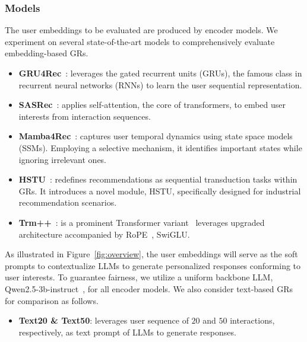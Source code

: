 \subsubsection{\textbf{Models}}
The user embeddings to be evaluated are produced by encoder models. 
We experiment on several state-of-the-art models to comprehensively evaluate embedding-based GRs. 
\begin{itemize}[leftmargin=*]
\item \textbf{GRU4Rec}~\cite{hidasi2015session}: leverages the gated recurrent units (GRUs), the famous class in recurrent neural networks (RNNs) to learn the user sequential representation.
\item \textbf{SASRec}~\cite{kang2018self}: applies self-attention, the core of transformers, to embed user interests from interaction sequences.
\item \textbf{Mamba4Rec}~\cite{liu2024mamba4rec}: captures user temporal dynamics using state space models (SSMs). Employing a selective mechanism, it identifies important states while ignoring irrelevant ones. 
\item \textbf{HSTU}~\cite{zhai2024actions}: redefines recommendations as sequential transduction tasks within GRs. It introduces a novel module, HSTU, specifically designed for industrial recommendation scenarios.
\item \textbf{Trm++}~\cite{zhai2024actions}: is a prominent Transformer variant~\cite{touvron2023llama} leverages upgraded architecture accompanied by RoPE~\cite{su2024roformer}, SwiGLU.
\end{itemize}
As illustrated in Figure~\ref{fig:overview}, the user embeddings will serve as the soft prompts to contextualize LLMs to generate personalized responses conforming to user interests. To guarantee fairness, we utilize a uniform backbone LLM, Qwen2.5-3b-instruct~\cite{yang2024qwen2}, for all encoder models. We also consider text-based GRs for comparison as follows.
\begin{itemize}[leftmargin=*]
\item \textbf{Text20 \& Text50}: leverages user sequence of $20$ and $50$ interactions, respectively, as text prompt of LLMs to generate responses.
\end{itemize}


